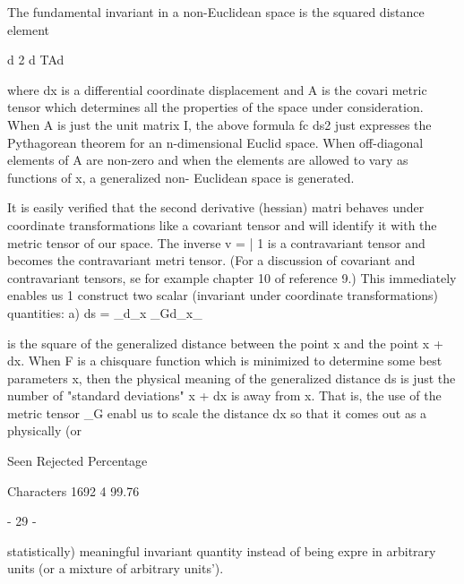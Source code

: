      The fundamental invariant in a non-Euclidean space is the squared
distance element
 
                               d 2   d TAd
 
 
 
 
 
 
 
 
 
 
 
 
 
 
 
 
 
 
 
 
 
 
 
 
 
 
where dx is a differential coordinate displacement and A is the covari
metric tensor which determines all the properties of the space under
consideration.  When A is just the unit matrix I, the above formula fc
ds2 just expresses the Pythagorean theorem for an n-dimensional Euclid
space.  When off-diagonal elements of A are non-zero and when the
elements are allowed to vary as functions of x, a generalized non-
Euclidean space is generated.
 
     It is easily verified that the second derivative (hessian) matri
behaves under coordinate transformations like a covariant tensor and
will identify it with the metric tensor of our space.  The inverse
v = | 1 is a contravariant tensor and becomes the contravariant metri
tensor.  (For a discussion of covariant and contravariant tensors, se
for example chapter 10 of reference 9.)  This immediately enables us 1
construct two scalar (invariant under coordinate transformations)
quantities:
a)    ds  = _d_x _Gd_x_
 
is the square of the generalized distance between the point x and the
point x + dx.  When F is a chisquare function which is minimized to
determine some best parameters x, then the physical meaning of the
generalized distance ds is just the number of "standard deviations"
x + dx is away from x.  That is, the use of the metric tensor _G enabl
us to scale the distance dx so that it comes out as a physically (or
 
                 Seen Rejected  Percentage
 
Characters       1692        4   99.76
 
                               - 29 -
 
 
statistically) meaningful invariant quantity instead of being expre
in arbitrary units (or a mixture of arbitrary units').
 
